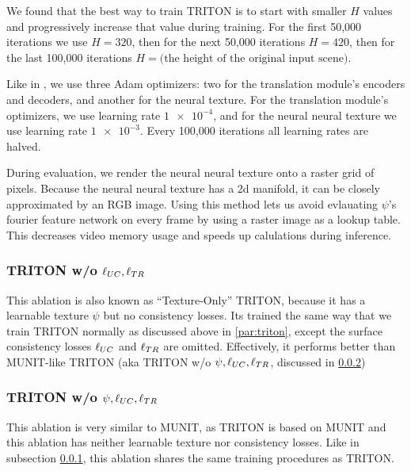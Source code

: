 	We found that the best way to train TRITON is to start with smaller $H$ values and progressively increase that value during training.
	For the first 50,000 iterations we use $H=320$, then for the next 50,000 iterations $H=420$, then for the last 100,000 iterations $H=\text{(the height of the original input scene)}$.

	Like in \cite{surgical_video_translation}, we use three Adam optimizers: two for the translation module's encoders and decoders, and another for the neural texture.
	For the translation module's optimizers, we use learning rate $\num{1e-4}$, and for the neural neural texture we use learning rate $\num{1e-3}$. 
	Every 100,000 iterations all learning rates are halved.

	During evaluation, we render the neural neural texture onto a raster grid of pixels. Because the neural neural texture has a 2d manifold, it can be closely approximated by an RGB image. Using this method lets us avoid evlauating $\psi$'s fourier feature network on every frame by using a raster image as a lookup table. This decreases video memory usage and speeds up calulations during inference.

	\subsubsection{TRITON w/o $\ell_{UC},\ell_{TR}$}
	\label{par:triton_without_luc}
	This ablation is also known as ``Texture-Only'' TRITON, because it has a learnable texture $\psi$ but no consistency losses.
	Its trained the same way that we train TRITON normally as discussed above in \ref{par:triton}, except the surface consistency losses $\ell_{UC}$ and $\ell_{TR}$ are omitted.
	Effectively, it performs better than MUNIT-like TRITON (aka TRITON w/o $\psi, \ell_{UC},\ell_{TR}$, discussed in \ref{par:munit_triton})

	\subsubsection{TRITON w/o $\psi, \ell_{UC},\ell_{TR}$}
	\label{par:munit_triton}
	This ablation is very similar to MUNIT, as TRITON is based on MUNIT and this ablation has neither learnable texture nor consistency losses.
	Like in subsection \ref{par:triton_without_luc}, this ablation shares the same training procedures as TRITON.

